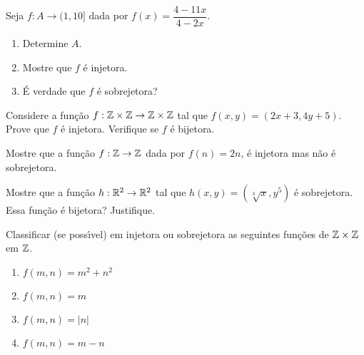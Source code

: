 \documentclass[12pt]{exam}
\begin{document}
    \vspace{.3cm}

    \questao{} Seja $f : A \to (1,10]$ dada por $f(x) = \dfrac{4 - 11x}{4 - 2x}$.
    \begin{enumerate}[label={\alph*})]
        \item Determine $A$.

        \item Mostre que $f$ \'e injetora.

        \item \'E verdade que $f$ \'e sobrejetora?
    \end{enumerate}

    \vspace{.3cm}

    \questao{} Considere a fun{\c c}{\~a}o $f : \mathbb{Z} \times \mathbb{Z} \to \mathbb{Z} \times \mathbb{Z}$ tal que $f(x,y) = (2x + 3, 4y + 5)$. Prove que $f$ {\'e} injetora. Verifique se $f$ {\'e} bijetora.

    \vspace{.3cm}

    \questao{} Mostre que a fun\c{c}\~ao $f : \mathbb{Z} \to \mathbb{Z}$ dada por $f(n) = 2n$, \'e injetora mas n\~ao \'e sobrejetora.

    \vspace{.3cm}

    \questao{} Mostre que a fun\c{c}\~ao $h : \mathbb{R}^2 \to \mathbb{R}^2$ tal que $h(x, y) = (\sqrt[3]{x}, y^5)$ \'e sobrejetora. Essa função é bijetora? Justifique.

    \vspace{.3cm}

    \questao{} Classificar (se poss{\'\i}vel) em injetora ou sobrejetora as seguintes fun{\c c}{\~o}es de $\mathbb{Z} \times \mathbb{Z}$ em $\mathbb{Z}$.

    \begin{multicols}{2}
        \begin{enumerate}[label={\alph*})]
            \item $f(m, n) = m^2 + n^2$

            \item $f(m, n) = m$

            \item $f(m, n) = |n|$

            \item $f(m, n) = m - n$

        \end{enumerate}
    \end{multicols}
\end{document}
